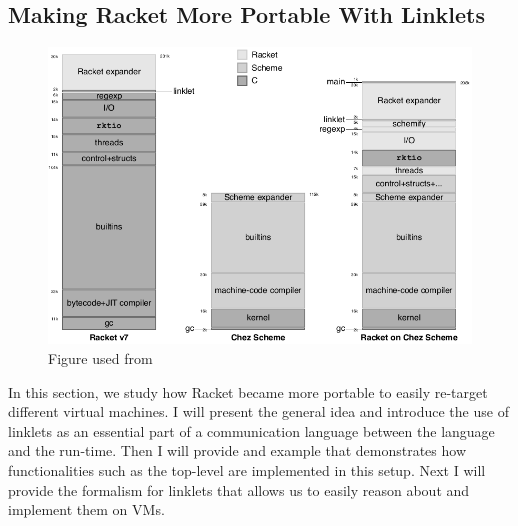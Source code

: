 
\subsection{Making Racket More Portable With Linklets}
\label{subsec:racket}

\begin{figure}[h!]
  \centering
  \includegraphics[scale=0.3]{img/racket-portable}
  \caption{Figure used from \cite{racket-on-chez-19}}
  \label{fig:racket-portable}
\end{figure}

In this section, we study how Racket became more portable to easily
re-target different virtual machines. I will present the general idea
and introduce the use of linklets as an essential part of a
communication language between the language and the run-time. Then I
will provide and example that demonstrates how functionalities such as
the top-level are implemented in this setup. Next I will provide the
formalism for linklets that allows us to easily reason about and
implement them on VMs.




